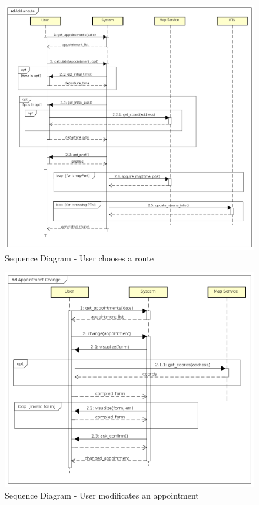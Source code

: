 \begin{figure}
	\centering
	\includegraphics[totalheight = \textheight]{Images/SequenceDiagrams/4_Add_a_route.png}
	\caption{\label{fig: sequenceDiagram4}Sequence Diagram - User chooses a route  }
\end{figure}

\begin{figure}
	\centering
	\includegraphics{Images/SequenceDiagrams/5_Appointment_Change.png}
	\caption{\label{fig: sequenceDiagram5}Sequence Diagram - User modificates an appointment  }
\end{figure}

